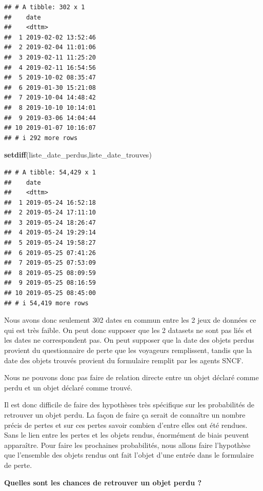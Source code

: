 \documentclass[
]{article}
\newenvironment{Shaded}{\begin{snugshade}}{\end{snugshade}}
\newcommand{\FunctionTok}[1]{\textcolor[rgb]{0.13,0.29,0.53}{\textbf{#1}}}
\newcommand{\NormalTok}[1]{#1}
\begin{document}
\begin{verbatim}
## # A tibble: 302 x 1
##    date               
##    <dttm>             
##  1 2019-02-02 13:52:46
##  2 2019-02-04 11:01:06
##  3 2019-02-11 11:25:20
##  4 2019-02-11 16:54:56
##  5 2019-10-02 08:35:47
##  6 2019-01-30 15:21:08
##  7 2019-10-04 14:48:42
##  8 2019-10-10 10:14:01
##  9 2019-03-06 14:04:44
## 10 2019-01-07 10:16:07
## # i 292 more rows
\end{verbatim}

\begin{Shaded}
\begin{Highlighting}[]
\FunctionTok{setdiff}\NormalTok{(liste\_date\_perdus,liste\_date\_trouves)}
\end{Highlighting}
\end{Shaded}

\begin{verbatim}
## # A tibble: 54,429 x 1
##    date               
##    <dttm>             
##  1 2019-05-24 16:52:18
##  2 2019-05-24 17:11:10
##  3 2019-05-24 18:26:47
##  4 2019-05-24 19:29:14
##  5 2019-05-24 19:58:27
##  6 2019-05-25 07:41:26
##  7 2019-05-25 07:53:09
##  8 2019-05-25 08:09:59
##  9 2019-05-25 08:16:59
## 10 2019-05-25 08:45:00
## # i 54,419 more rows
\end{verbatim}

Nous avons donc seulement 302 dates en commun entre les 2 jeux de
données ce qui est très faible. On peut donc supposer que les 2 datasets
ne sont pas liés et les dates ne correspondent pas. On peut supposer que
la date des objets perdus provient du questionnaire de perte que les
voyageurs remplissent, tandis que la date des objets trouvés provient du
formulaire remplit par les agents SNCF.

Nous ne pouvons donc pas faire de relation directe entre un objet
déclaré comme perdu et un objet déclaré comme trouvé.

Il est donc difficile de faire des hypothèses très spécifique sur les
probabilités de retrouver un objet perdu. La façon de faire ça serait de
connaître un nombre précis de pertes et sur ces pertes savoir combien
d'entre elles ont été rendues. Sans le lien entre les pertes et les
objets rendus, énormément de biais peuvent apparaître. Pour faire les
prochaines probabilités, nous allons faire l'hypothèse que l'ensemble
des objets rendus ont fait l'objet d'une entrée dans le formulaire de
perte.

\textbf{Quelles sont les chances de retrouver un objet perdu ?}
\end{document}
